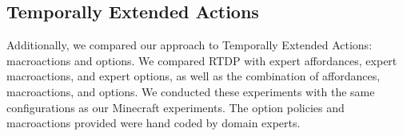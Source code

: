 \documentclass[conference]{IEEEtran}
\begin{document}

\subsection{Temporally Extended Actions}
Additionally, we compared our approach to Temporally Extended Actions: 
macroactions and options. We compared RTDP with expert affordances, 
expert macroactions, and expert options, as well as the combination of 
affordances, macroactions, and options. We conducted these experiments 
with the same configurations as our Minecraft experiments. The option policies
and macroactions provided were hand coded by domain experts.
\end{document}
